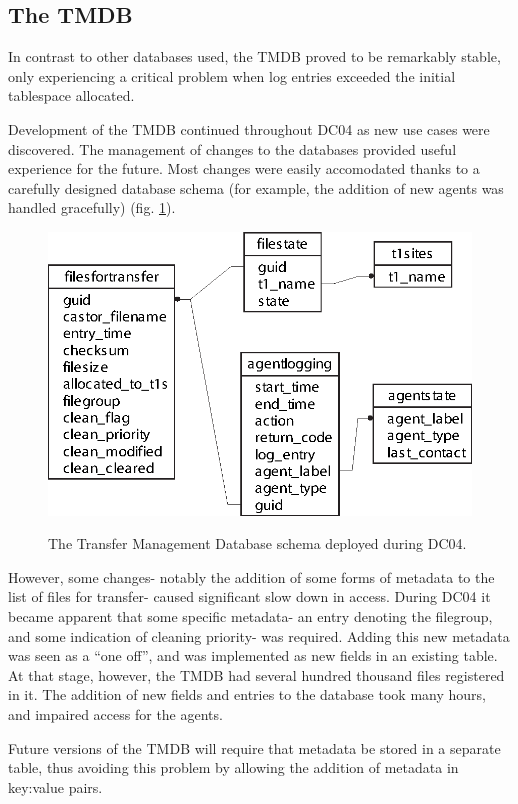 \documentclass{cmspaper}
\begin{document}
\subsection{The TMDB}
In contrast to other databases used, the TMDB proved to be remarkably
stable, only experiencing a critical problem when log entries exceeded
the initial tablespace allocated.

Development of the TMDB continued throughout DC04 as new use cases
were discovered. The management of changes to the databases provided
useful experience for the future. Most changes were easily accomodated
thanks to a carefully designed database schema (for example, the
addition of new agents was handled gracefully)
(fig. \ref{fig:schema}).

\begin{figure}[tbp]
\centering
\includegraphics{v1_tmdb.eps}
\label{fig:schema}
\caption{The Transfer Management Database schema deployed during DC04.}
\end{figure} 

However, some changes- notably the addition of some forms of metadata
to the list of files for transfer- caused significant slow down in
access. During DC04 it became apparent that some specific metadata- an
entry denoting the filegroup, and some indication of cleaning
priority- was required. Adding this new metadata was seen as a ``one
off'', and was implemented as new fields in an existing table. At that
stage, however, the TMDB had several hundred thousand files registered
in it. The addition of new fields and entries to the database took
many hours, and impaired access for the agents.

Future versions of the TMDB will require that metadata be stored in a
separate table, thus avoiding this problem by allowing the addition of
metadata in key:value pairs.
\end{document}
